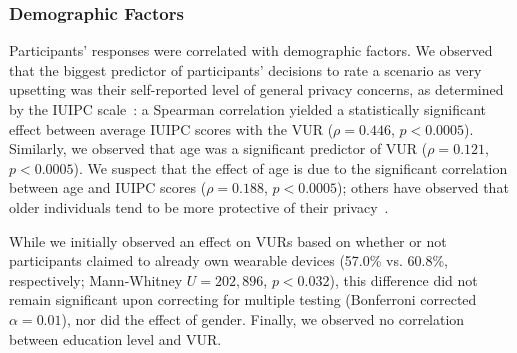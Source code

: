 \subsubsection{Demographic Factors}

Participants' responses were correlated with demographic factors. We observed that the biggest predictor of participants' decisions to rate a scenario as very upsetting was their self-reported level of general privacy concerns, as determined by the IUIPC scale~\cite{malhotra2004internet}: a Spearman correlation yielded a statistically significant effect between average IUIPC scores with the VUR ($\rho=0.446$, $p<0.0005$). Similarly, we observed that age was a significant predictor of VUR ($\rho=0.121$, $p<0.0005$). We suspect that the effect of age is due to the significant correlation between age and IUIPC scores ($\rho=0.188$, $p<0.0005$); others have observed that older individuals tend to be more protective of their privacy~\cite{varian2005demographics}.

While we initially observed an effect on VURs based on whether or not participants claimed to already own wearable devices (57.0\% vs. 60.8\%, respectively; Mann-Whitney $U=202,896$, $p<0.032$), this difference did not remain significant upon correcting for multiple testing (Bonferroni corrected $\alpha=0.01$), nor did the effect of gender. Finally, we observed no correlation between education level and VUR.
